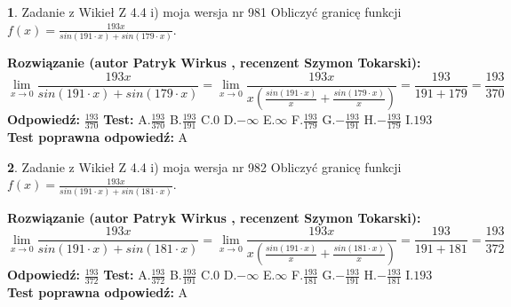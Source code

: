 \documentclass[12pt, a4paper]{article}
\theoremstyle{definition} %
\newtheorem{zad}{}
\newcommand{\zadStart}[1]{\begin{zad}#1\newline}
\newcommand{\zadStop}{\end{zad}}
\newcommand{\rozwStart}[2]{\noindent \textbf{Rozwiązanie (autor #1 , recenzent #2): }\newline}
\newcommand{\rozwStop}{\newline}
\newcommand{\odpStart}{\noindent \textbf{Odpowiedź:}\newline}
\newcommand{\odpStop}{\newline}
\newcommand{\testStart}{\noindent \textbf{Test:}\newline}
\newcommand{\testStop}{\newline}
\newcommand{\kluczStart}{\noindent \textbf{Test poprawna odpowiedź:}\newline}
\newcommand{\kluczStop}{\newline}
\begin{document}
\zadStart{Zadanie z Wikieł Z 4.4 i) moja wersja nr 981}
Obliczyć granicę funkcji $f(x)=\frac{193x}{sin(191\cdot x) +sin(179\cdot x)}$.
\zadStop
\rozwStart{Patryk Wirkus}{Szymon Tokarski}
$$\lim\limits_{x\to 0}\frac{193x}{sin(191\cdot x) +sin(179\cdot x)}=\lim\limits_{x\to 0}\frac{193x}{x(\frac{sin(191\cdot x)}{x}+\frac{sin(179\cdot x)}{x})}=\frac{193}{191+179} = \frac{193}{370}$$
\rozwStop
\odpStart
$\frac{193}{370}$
\odpStop
\testStart
A.$\frac{193}{370}$
B.$\frac{193}{191}$
C.$0$
D.$-\infty$
E.$\infty$
F.$\frac{193}{179}$
G.$-\frac{193}{191}$
H.$-\frac{193}{179}$
I.$193$
\testStop
\kluczStart
A
\kluczStop



\zadStart{Zadanie z Wikieł Z 4.4 i) moja wersja nr 982}
Obliczyć granicę funkcji $f(x)=\frac{193x}{sin(191\cdot x) +sin(181\cdot x)}$.
\zadStop
\rozwStart{Patryk Wirkus}{Szymon Tokarski}
$$\lim\limits_{x\to 0}\frac{193x}{sin(191\cdot x) +sin(181\cdot x)}=\lim\limits_{x\to 0}\frac{193x}{x(\frac{sin(191\cdot x)}{x}+\frac{sin(181\cdot x)}{x})}=\frac{193}{191+181} = \frac{193}{372}$$
\rozwStop
\odpStart
$\frac{193}{372}$
\odpStop
\testStart
A.$\frac{193}{372}$
B.$\frac{193}{191}$
C.$0$
D.$-\infty$
E.$\infty$
F.$\frac{193}{181}$
G.$-\frac{193}{191}$
H.$-\frac{193}{181}$
I.$193$
\testStop
\kluczStart
A
\kluczStop
\end{document}
